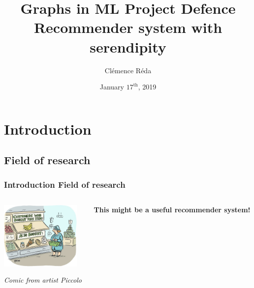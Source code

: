 \documentclass[10pt,frenchb]{beamer}
\author{Cl\'{e}mence R\'{e}da}
\title[Recommender system with serendipity]{\textbf{Graphs in ML Project Defence}\\
Recommender system with serendipity}
\institute{\'{E}cole Normale Sup\'{e}rieure Paris-Saclay}
\date{January $17^{\text{th}}$, 2019}
\begin{document}
\maketitle


\section{Introduction}

\subsection{Field of research}

\begin{frame}
\frametitle{\textbf{Introduction} Field of research}

\begin{center}\end{center}

\begin{columns}
\begin{column}{0.7\textwidth}
\begin{center}
\includegraphics[height=125px]{images/recommender.jpeg}
\end{center}
\begin{center}\textit{Comic from artist Piccolo}\end{center}
\end{column}

\begin{column}{0.3\textwidth}
\begin{center}\textbf{This might be a useful recommender system!}\end{center}
\end{column}
\end{columns}

\end{frame}
\end{document}
